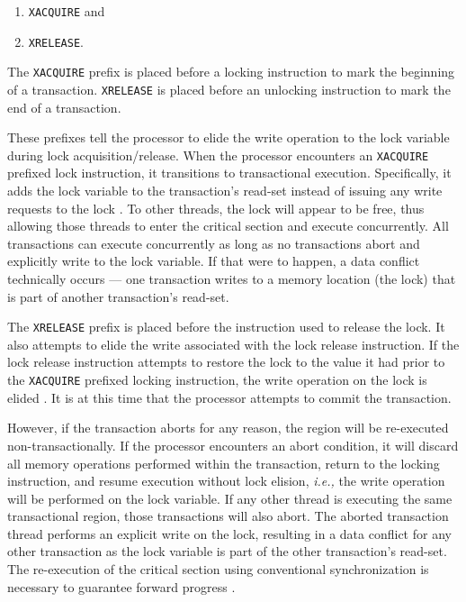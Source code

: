 \documentclass[11pt]{book}
\begin{document}
\vspace*{-\bigskipamount}
\begin{singlespace}
\begin{enumerate}
  \item \texttt{XACQUIRE} and 
  \item \texttt{XRELEASE}.
\end{enumerate}
\end{singlespace}

\noindent
The \texttt{XACQUIRE} prefix is placed before a locking instruction to mark the beginning
of a transaction.  \texttt{XRELEASE} is placed before an unlocking instruction to mark the
end of a transaction.

These prefixes tell the processor to elide the write operation to the lock variable during
lock acquisition/release.  When the processor encounters an \texttt{XACQUIRE} prefixed
lock instruction, it transitions to transactional execution.  Specifically, it adds the
lock variable to the transaction's read-set instead of issuing any write requests to the
lock \cite{intel_prog_ref}.  To other threads, the lock will appear to be free, thus
allowing those threads to enter the critical section and execute concurrently.  All
transactions can execute concurrently as long as no transactions abort and explicitly
write to the lock variable.  If that were to happen, a data conflict technically occurs
--- one transaction writes to a memory location (the lock) that is part of another
transaction's read-set.

The \texttt{XRELEASE} prefix is placed before the instruction used to release the lock.
It also attempts to elide the write associated with the lock release instruction.  If the
lock release instruction attempts to restore the lock to the value it had prior to the
\texttt{XACQUIRE} prefixed locking instruction, the write operation on the lock is elided
\cite{intel_prog_ref}.  It is at this time that the processor attempts to commit the
transaction.

However, if the transaction aborts for any reason, the region will be re-executed
non-transactionally.  If the processor encounters an abort condition, it will discard all
memory operations performed within the transaction, return to the locking instruction, and
resume execution without lock elision, \emph{i.e.,} the write operation will be performed
on the lock variable.  If any other thread is executing the same transactional region,
those transactions will also abort.  The aborted transaction thread performs an explicit
write on the lock, resulting in a data conflict for any other transaction as the lock
variable is part of the other transaction's read-set.  The re-execution of the critical
section using conventional synchronization is necessary to guarantee forward progress
\cite{intel_prog_ref}.
\end{document}
